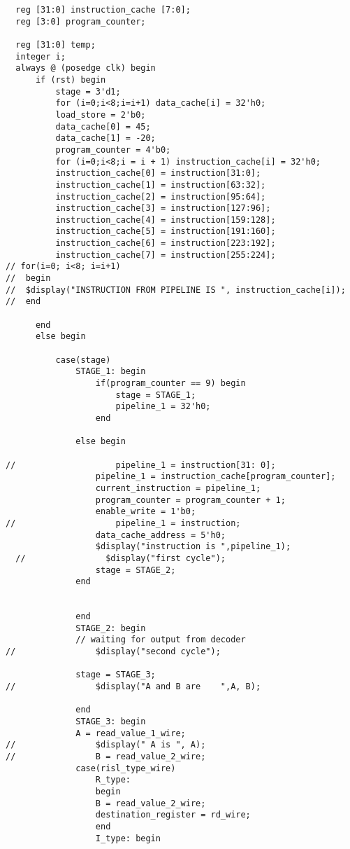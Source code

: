 \begin{lstlisting}
  reg [31:0] instruction_cache [7:0];
  reg [3:0] program_counter;

  reg [31:0] temp;
  integer i;
  always @ (posedge clk) begin
      if (rst) begin
          stage = 3'd1;
          for (i=0;i<8;i=i+1) data_cache[i] = 32'h0; 
          load_store = 2'b0;
          data_cache[0] = 45;
          data_cache[1] = -20;
          program_counter = 4'b0;
          for (i=0;i<8;i = i + 1) instruction_cache[i] = 32'h0;
          instruction_cache[0] = instruction[31:0];
          instruction_cache[1] = instruction[63:32];
          instruction_cache[2] = instruction[95:64];
          instruction_cache[3] = instruction[127:96];
          instruction_cache[4] = instruction[159:128];
          instruction_cache[5] = instruction[191:160];
          instruction_cache[6] = instruction[223:192];
          instruction_cache[7] = instruction[255:224];
// for(i=0; i<8; i=i+1) 
//  begin
//  $display("INSTRUCTION FROM PIPELINE IS ", instruction_cache[i]);
//  end
      
      end
      else begin
      
          case(stage)
              STAGE_1: begin
                  if(program_counter == 9) begin
                      stage = STAGE_1;
                      pipeline_1 = 32'h0;
                  end
              
              else begin
              
//                    pipeline_1 = instruction[31: 0];
                  pipeline_1 = instruction_cache[program_counter];
                  current_instruction = pipeline_1;
                  program_counter = program_counter + 1;
                  enable_write = 1'b0;
//                    pipeline_1 = instruction;
                  data_cache_address = 5'h0;
                  $display("instruction is ",pipeline_1);
  //                $display("first cycle");
                  stage = STAGE_2;
              end
              
              
              end
              STAGE_2: begin
              // waiting for output from decoder
//                $display("second cycle");

              stage = STAGE_3;
//                $display("A and B are    ",A, B);
              
              end
              STAGE_3: begin
              A = read_value_1_wire;
//                $display(" A is ", A);
//                B = read_value_2_wire;
              case(risl_type_wire)
                  R_type: 
                  begin
                  B = read_value_2_wire;
                  destination_register = rd_wire;
                  end
                  I_type: begin
                  

\end{lstlisting}
